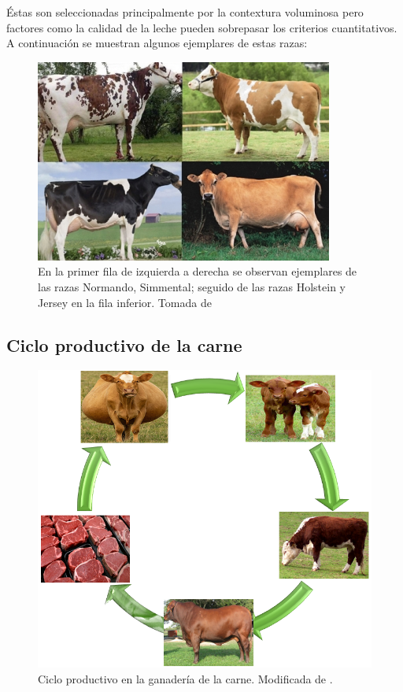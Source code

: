 Éstas son seleccionadas principalmente por la contextura voluminosa pero factores como la calidad de la leche pueden sobrepasar los criterios cuantitativos. A continuación se muestran algunos ejemplares de estas razas:

\begin{figure}[H]
 \begin{center}
 \includegraphics[scale=0.9]{img/razaslecheras.png}
 \caption{En la primer fila de izquierda a derecha se observan ejemplares de las razas Normando, Simmental; seguido de las razas Holstein y Jersey en la fila inferior. Tomada de \cite{contextoganadero} \label{cuadrorazaspng}}
  \end{center}
\end{figure}

\subsection{Ciclo productivo de la carne}

\begin{figure}[H]
\begin{center}
\includegraphics[scale=0.5]{img/ganadcarne2.png}
\end{center}
\caption{Ciclo productivo en la ganadería de la carne.  Modificada de \cite{contextoganadero}. \label{ganadcarnepng}}
\end{figure}

